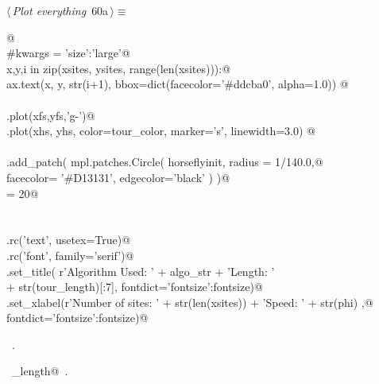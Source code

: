 \documentclass[11.5pt]{report}
\begin{document}
\vspace{-0.8cm} \newchunk
\begin{flushleft} \small
\begin{minipage}{\linewidth}\label{scrap90}\raggedright\small
{} $\langle\,${\itshape Plot everything}\nobreak\ {\footnotesize {60a}}$\,\rangle\equiv$
\vspace{-1ex}
\begin{list}{}{} \item
\mbox{}\verb@ @\\
\mbox{}\verb@#kwargs = {'size':'large'}@\\
\mbox{}\verb@for x,y,i in zip(xsites, ysites, range(len(xsites))):@\\
\mbox{}\verb@    ax.text(x, y, str(i+1), bbox=dict(facecolor='#ddcba0', alpha=1.0)) @\\
\mbox{}\verb@@\\
\mbox{}\verb@ax.plot(xfs,yfs,'g-')@\\
\mbox{}\verb@ax.plot(xhs, yhs, color=tour_color, marker='s', linewidth=3.0) @\\
\mbox{}\verb@@\\
\mbox{}\verb@ax.add_patch( mpl.patches.Circle( horseflyinit, radius = 1/140.0,@\\
\mbox{}\verb@                                  facecolor= '#D13131', edgecolor='black'   )  )@\\
\mbox{}\verb@fontsize = 20@\\
\mbox{}\verb@@\\
\mbox{}\verb@@\\
\mbox{}\verb@plt.rc('text', usetex=True)@\\
\mbox{}\verb@plt.rc('font', family='serif')@\\
\mbox{}\verb@ax.set_title( r'Algorithm Used: ' + algo_str +  '\nTour Length: ' \@\\
\mbox{}\verb@               + str(tour_length)[:7], fontdict={'fontsize':fontsize})@\\
\mbox{}\verb@ax.set_xlabel(r'Number of sites: ' + str(len(xsites)) + '\nDrone Speed: ' + str(phi) ,@\\
\mbox{}\verb@                  fontdict={'fontsize':fontsize})@\\
\mbox{}\verb@@{\NWsep}
\end{list}
\vspace{-1.5ex}
\footnotesize
\begin{list}{}{\setlength{\itemsep}{-\parsep}\setlength{\itemindent}{-\leftmargin}}
\item \NWtxtMacroRefIn\ .
\item \NWtxtIdentsUsed\nobreak\  \verb@tour_length@\nobreak\ .
\item{}
\end{list}
\end{minipage}\vspace{4ex}
\end{flushleft}
\end{document}
